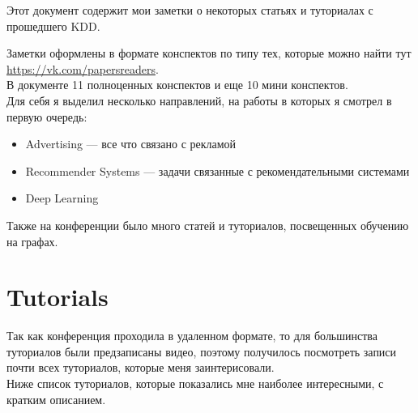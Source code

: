 Этот документ содержит мои заметки о некоторых статьях и туториалах с прошедшего KDD.

Заметки оформлены в формате конспектов по типу тех, которые можно найти тут \url{https://vk.com/papersreaders}. \\

В документе 11 полноценных конспектов и еще 10 мини конспектов. \\

Для себя я выделил несколько направлений, на работы в которых я смотрел в первую очередь:
\begin{itemize}
    \item Advertising --- все что связано с рекламой
    \item Recommender Systems --- задачи связанные с рекомендательными системами
    \item Deep Learning
\end{itemize}

Также на конференции было много статей и туториалов, посвещенных обучению на графах.

\chapter{Tutorials}

Так как конференция проходила в удаленном формате, то для большинства туториалов были предзаписаны видео, поэтому получилось посмотреть записи почти всех туториалов, которые меня заинтерисовали. \\

Ниже список туториалов, которые показались мне наиболее интересными, с кратким описанием.







